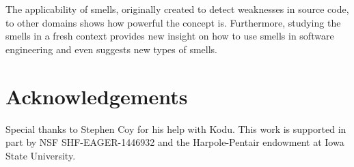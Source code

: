 \documentclass{sig-alternate}
\begin{document}
The applicability of smells, originally created to detect weaknesses in source code, to other domains shows how powerful the concept is. Furthermore, studying the smells in a fresh context provides new insight on how to use smells in software engineering and even suggests new types of smells. 

\balance

\section*{Acknowledgements}
Special thanks to Stephen Coy for his help with Kodu. This work is supported in part by  NSF SHF-EAGER-1446932 and the Harpole-Pentair endowment at Iowa State University.




\end{document}
